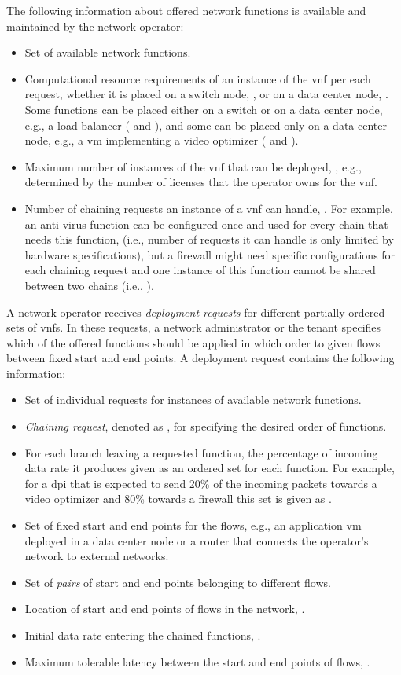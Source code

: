 \documentclass[10pt,a4paper,conference]{IEEEtran}
\begin{document}
The following information about offered network functions is available and 
maintained by the network operator:
\begin{itemize}
 \item Set  of available network functions.
 \item Computational resource requirements  of an 
 instance of the \ac{vnf}  per each request, whether it is placed on a switch 
 node, , or on a data center node, .
 Some functions can be placed either on a switch or on a data center node, e.g., 
 a load balancer ( and ), and some can be placed only 
 on a data center node, e.g., a \ac{vm} implementing a video optimizer 
 ( and ).
 \item Maximum number of instances of the \ac{vnf} that can be deployed, 
 , e.g., determined by the number 
 of licenses that the operator owns for the \ac{vnf}.
 \item Number of chaining requests an instance of a \ac{vnf} can handle, 
 . For example, 
 an anti-virus function can be configured once and used for every chain that needs this function,
 (i.e., number of requests it can handle is only limited by hardware specifications),
 but a firewall might need specific configurations for each chaining request and
 one instance of this function cannot be shared between two chains (i.e., ).
\end{itemize}

A network operator receives \emph{deployment requests} for different partially ordered sets 
of \acp{vnf}. In these requests, a network administrator or the tenant specifies which 
of the offered functions should be applied in which order to given flows
between fixed start and end points. A deployment request contains the following information:
\begin{itemize}
 \item Set  of individual requests for instances of available network functions.
 \item \emph{Chaining request}, denoted as , for specifying the desired order of functions.
\item For each branch leaving a requested function, the percentage of incoming
 data rate it produces given as an ordered set  for each function.
 For example, for a \ac{dpi} that is expected to send 20\% of the incoming packets 
 towards a video optimizer and 80\% towards a firewall this set is given as .
 \item Set  of fixed start and end points for the flows, e.g., an application 
 \ac{vm} deployed in a data center node or 
 a router that connects the operator's network to external networks. 
 \item Set  of \emph{pairs} of start 
 and end points belonging to different flows.
 \item Location of start and end points of flows in the network, .
 \item Initial data rate entering the chained functions, .
 \item Maximum tolerable latency between the start and end points of flows, 
 .
\end{itemize}
\end{document}

